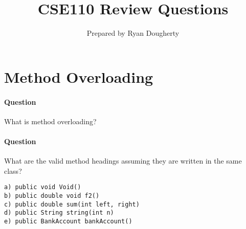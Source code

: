 \documentclass{article}
\title{CSE110 Review Questions}
\author{Prepared by Ryan Dougherty}
\date{}
\begin{document}
\maketitle

\section{Method Overloading}


\setcounter{question_num}{1}
\paragraph{Question }
What is method overloading? 

\addtocounter{question_num}{1}
\paragraph{Question }
What are the valid method headings assuming they are written in the same class?
\begin{lstlisting}
a) public void Void()
b) public double void f2()
c) public double sum(int left, right)
d) public String string(int n)
e) public BankAccount bankAccount()
\end{lstlisting}
\end{document}
